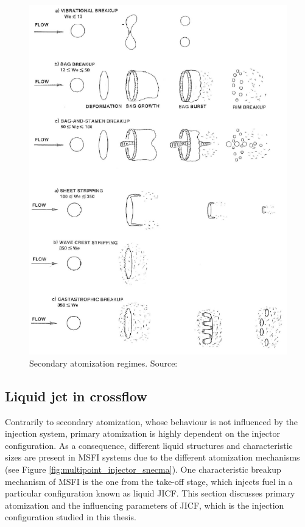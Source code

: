 \begin{itemize}
	\begin{figure}[h!]
		\centering
		\includegraphics[scale=1.0]{./part0_intro/regimes_atomization_secondary}
		\caption[Secondary atomization regimes]{Secondary atomization regimes. Source: }
		\label{fig:regimes_atomization_secondary}
	\end{figure}

\end{itemize}



\subsection*{Liquid jet in crossflow}

Contrarily to secondary atomization, whose behaviour is not influenced by the injection system, primary atomization is highly dependent on the injector configuration. As a consequence, different liquid structures and characteristic sizes are present in MSFI systems due to the different atomization mechanisms (see Figure \ref{fig:multipoint_injector_snecma}). One characteristic breakup mechanism of MSFI is the one from the take-off stage, which injects fuel in a particular configuration known as liquid JICF. This section discusses primary atomization and the influencing parameters of JICF, which is the injection configuration studied in this thesis.

